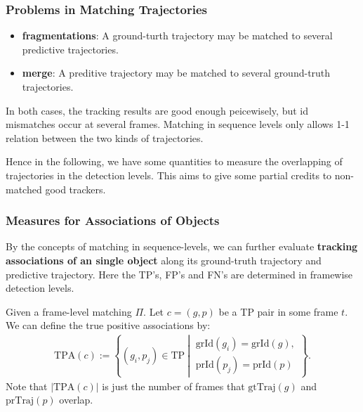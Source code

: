 \documentclass[slidetop, mathserif]{beamer}
\begin{document}
\begin{frame}
	\frametitle{Problems in Matching Trajectories}
	
	\begin{itemize}
		\item {\bf fragmentations}:
		      A ground-turth trajectory may be matched
		      to several predictive trajectories.
		\item {\bf merge}:
		      A preditive trajectory may be matched to several ground-truth trajectories.
	\end{itemize}
	In both cases, the tracking results are good enough peicewisely,
	but id mismatches occur at several frames.
	Matching in sequence levels only allows 1-1 relation
	between the two kinds of trajectories.
	
	\vspace{4pt}
	
	Hence in the following, we have some quantities to measure
	the overlapping of trajectories in the detection levels.
	This aims to give some partial credits to non-matched good trackers.
	
\end{frame}

\begin{frame}
	\frametitle{Measures for Associations of Objects}
	
	By the concepts of matching in sequence-levels,
	we can further evaluate {\bf tracking associations of an single object}
	along its ground-truth trajectory and predictive trajectory.
	{\color{red} Here the TP's, FP's and FN's are determined in framewise detection levels.}
	
	\vspace{4pt}
	
	Given a frame-level matching $\Pi$.
	Let $c = (g,p)$ be a TP pair in some frame $t$. We can define the true positive
	associations by:
	\begin{align*}
		\text{TPA}(c) :=                       
		\left\{(g_i, p_j)\in\text{TP}\ \left|\ 
		\begin{array}{c}                       
		\text{grId}(g_i)=\text{grId}(g),       \\
		\text{prId}(p_j) = \text{prId}(p)      
		\end{array}\right.                     
		\right\}.                              
	\end{align*}
	Note that $|\text{TPA}(c)|$ is just the number of frames that $\text{gtTraj}(g)$
	and $\text{prTraj}(p)$ overlap.
	
\end{frame}
\end{document}

